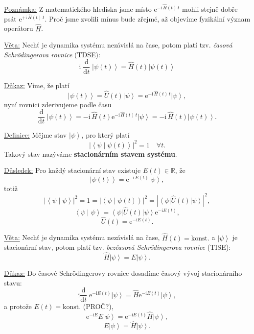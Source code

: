 \documentclass[10pt,a4paper]{article}
\newcommand{\const}[1]{\text{#1}}
\newcommand{\abs}[1]{\left| #1 \right|}
\newcommand{\dd}[2]{\frac{\const{d} #1}{\const{d} #2} \;}
\newcommand{\bra}[1]{\left< #1 \right|}
\newcommand{\ket}[1]{\left| #1 \right>}
\newcommand{\braket}[2]{\left< #1 \middle| #2 \right>}
\newcommand{\e}[1]{\const{e}^{#1}}
\renewcommand{\i}{\const{i}}
\def\R{\mathbb{R}}
\def\konst{\mathrm{konst.}}
\begin{document}
\vspace{2em}
\underline{Poznámka:}
Z matematického hlediska jsme místo $\e{-\i \, \hat{H}(t) \, t}$ mohli stejně dobře psát $\e{+\i \, \hat{H}(t) \, t}$. Proč jsme zvolili mínus bude zřejmé, až objevíme fyzikální význam operátoru $\hat{H}$.

\vspace{2em}
\underline{Věta:}
Nechť je dynamika systému nezávislá na čase, potom platí tzv. \textit{časová Schrödingerova rovnice} (TDSE):
$$ \i \; \dd{}{t} \! \ket{\psi(t)} = \hat{H}(t) \ket{\psi(t)} $$

\underline{Důkaz:}
Víme, že platí $$\ket{\psi(t)} = \hat{U}(t) \ket{\psi} = \e{-\i \, \hat{H}(t) \, t} \ket{\psi},$$ nyní rovnici zderivujeme podle času $$\dd{}{t} \ket{\psi(t)} = -\i \, \hat{H}(t) \e{-\i \, \hat{H}(t) \, t} \ket{\psi} = -\i \, \hat{H}(t) \ket{\psi(t)}.$$

\vspace{2em}
\underline{Definice:}
Mějme stav $\ket{\psi}$, pro který platí $$\abs{\braket{\psi}{\psi(t)}}^2 = 1 \quad \forall t.$$ Takový stav nazýváme \textbf{stacionárním stavem systému}.

\vspace{2em}
\underline{Důsledek:}
Pro každý stacionární stav existuje $E(t) \in \R$, že $$\ket{\psi(t)} = \e{-\i \, E(t)} \ket{\psi},$$ totiž $$\abs{\braket{\psi}{\psi}}^2 = 1 = \abs{\braket{\psi}{\psi(t)}}^2 = \abs{\bra{\psi} \hat{U}(t) \ket{\psi}}^2,$$ $$\braket{\psi}{\psi} = \bra{\psi} \hat{U}(t) \ket{\psi} \e{-\i E(t)},$$ $$\hat{U}(t) = \e{-\i E(t)}.$$

\vspace{2em}
\underline{Věta:}
Nechť je dynamika systému nezávislá na čase, $\hat{H}(t) = \konst$ a $\ket{\psi}$ je stacionární stav, potom platí tzv. \textit{bezčasová Schrödingerova rovnice} (TISE): $$\hat{H} \ket{\psi} = E \ket{\psi}.$$

\underline{Důkaz:}
Do časové Schrödingerovy rovnice dosadíme časový vývoj stacionárního stavu: $$\i \dd{}{t} \e{-\i E(t)} \ket{\psi} = \hat{H} \e{-\i E(t)} \ket{\psi},$$ a protože $E(t) = \konst$ (PROČ?), $$\e{-\i E} E \ket{\psi} = \e{-\i E(t)} \hat{H} \ket{\psi},$$ $$E \ket{\psi} = \hat{H} \ket{\psi}.$$
\end{document}
